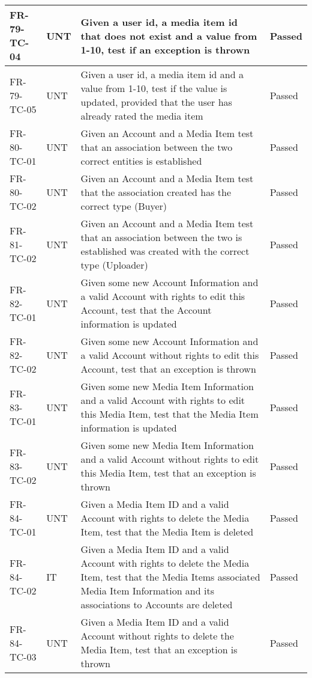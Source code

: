 \documentclass[../report.tex]{subfiles}
\begin{document}
\begin{longtable}{|L{2.1cm}|L{1cm}|L{12.4cm}|L{1.4cm}|}
FR-79-TC-04&UNT&Given a user id, a media item id that does not exist and a value from 1-10, test if an exception is thrown&Passed  \\ \hline
FR-79-TC-05&UNT&Given a user id, a media item id and a value from 1-10, test if the value is updated, provided that the user has already rated the media item&Passed  \\ \hline
FR-80-TC-01&UNT&Given an Account and a Media Item test that an association between the two correct entities is established &Passed  \\ \hline
FR-80-TC-02&UNT&Given an Account and a Media Item test that the association created has the correct type (Buyer)&Passed  \\ \hline
FR-81-TC-02&UNT&Given an Account and a Media Item test that an association between the two is established was created with the correct type (Uploader)&Passed  \\ \hline
FR-82-TC-01&UNT&Given some new Account Information and a valid Account with rights to edit this Account, test that the Account information is updated&Passed  \\ \hline
FR-82-TC-02&UNT&Given some new Account Information and a valid Account without rights to edit this Account, test that an exception is thrown&Passed  \\ \hline
FR-83-TC-01&UNT&Given some new Media Item Information and a valid Account with rights to edit this Media Item, test that the Media Item information is updated&Passed  \\ \hline
FR-83-TC-02&UNT&Given some new Media Item Information and a valid Account without rights to edit this Media Item, test that an exception is thrown&Passed  \\ \hline
FR-84-TC-01&UNT&Given a Media Item ID and a valid Account with rights to delete the Media Item, test that the Media Item is deleted&Passed  \\ \hline
FR-84-TC-02&IT&Given a Media Item ID and a valid Account with rights to delete the Media Item, test that the Media Items associated Media Item Information and its associations to Accounts are deleted&Passed  \\ \hline
FR-84-TC-03&UNT&Given a Media Item ID and a valid Account without rights to delete the Media Item, test that an exception is thrown&Passed  \\ \hline

\end{longtable}
\end{document}
